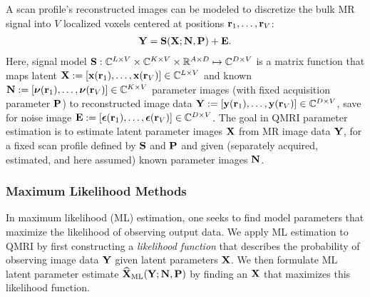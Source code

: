 A scan profile's reconstructed images
can be modeled 
to discretize the bulk MR signal 
into $V$ localized voxels
centered at positions $\mathbf{r}_1,\dots,\mathbf{r}_V$:
\begin{align}
	\bmY = \bmS\paren{\bmX; \bmN, \bmP} + \bmE.
	\label{eq:relax,mod-mtx}
\end{align}
Here, signal model
$\mathbf{S} : \mathbb{C}^{L\times V} \times \mathbb{C}^{K\times V}
\times \mathbb{R}^{A \times D} \mapsto \mathbb{C}^{D \times V}$ 
is a matrix function
that maps latent 
$\bmX := \brac{\bmx\paren{\bmr_1},\dots,\bmx\paren{\bmr_V}} 
\in \complexes{L\times V}$
and known 
$\bmN := \brac{\bmnu\paren{\bmr_1},\dots,\bmnu\paren{\bmr_V}} 
\in \complexes{K\times V}$
parameter images 
(with fixed acquisition parameter $\mathbf{P}$)
to reconstructed image data
$\bmY := \brac{\bmy\paren{\bmr_1},\dots,\bmy\paren{\bmr_V}} 
\in \complexes{D\times V}$,
save for noise image
$\bmE := \brac{\bmeps\paren{\bmr_1},\dots,\bmeps\paren{\bmr_V}} 
\in \complexes{D\times V}$. 
The goal in QMRI parameter estimation
is to estimate latent parameter images $\mathbf{X}$ 
from MR image data $\mathbf{Y}$,
for a fixed scan profile defined by $\mathbf{S}$ and $\mathbf{P}$
and given (separately acquired, estimated, and here assumed)
known parameter images $\mathbf{N}$.

\subsubsection{Maximum Likelihood Methods}
\label{sss,relax,meth,est,ml}

In maximum likelihood (ML) estimation,
one seeks to find model parameters
that maximize the likelihood
of observing output data.
We apply ML estimation to QMRI
by first constructing 
a \emph{likelihood function}
that describes the probability 
of observing image data $\mathbf{Y}$
given latent parameters $\mathbf{X}$.
We then formulate 
ML latent parameter estimate $\estaML{\bmX}{\bmY; \bmN, \bmP}$ 
by finding an $\mathbf{X}$
that maximizes this likelihood function. 

